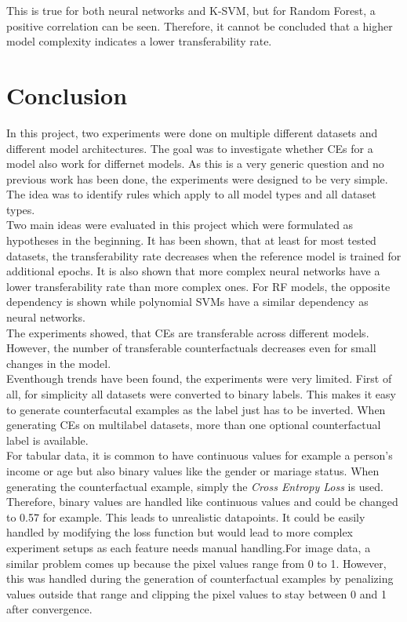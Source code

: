 \documentclass{article}
\begin{document}
This is true for both neural networks and K-SVM, but for Random Forest, a positive correlation can be seen. Therefore, it cannot be concluded that a higher model complexity indicates a lower transferability rate. 

\section{Conclusion}
In this project, two experiments were done on multiple different datasets and different model architectures. The goal was to investigate whether CEs for a model also work for differnet models. As this is a very generic question and no previous work has been done, the experiments were designed to be very simple. The idea was to identify rules which apply to all model types and all dataset types.\\
Two main ideas were evaluated in this project which were formulated as hypotheses in the beginning. It has been shown, that at least for most tested datasets, the transferability rate decreases when the reference model is trained for additional epochs. It is also shown that more complex neural networks have a lower transferability rate than more complex ones. For RF models, the opposite dependency is shown while polynomial SVMs have a similar dependency as neural networks. \\
The experiments showed, that CEs are transferable across different models. However, the number of transferable counterfactuals decreases even for small changes in the model. \\
Eventhough trends have been found, the experiments were very limited. First of all, for simplicity all datasets were converted to binary labels. This makes it easy to generate counterfacutal examples as the label just has to be inverted. When generating CEs on multilabel datasets, more than one optional counterfactual label is available. \\
For tabular data, it is common to have continuous values for example a person's income or age but also binary values like the gender or mariage status. When generating the counterfactual example, simply the \textit{Cross Entropy Loss} \cite{mao2023crossentropylossfunctionstheoretical} is used. Therefore, binary values are handled like continuous values and could be changed to 0.57 for example. This leads to unrealistic datapoints. It could be easily handled by modifying the loss function but would lead to more complex experiment setups as each feature needs manual handling.For image data, a similar problem comes up because the pixel values range from 0 to 1. However, this was handled during the generation of counterfactual examples by penalizing values outside that range and clipping the pixel values to stay between 0 and 1 after convergence.\\
\end{document}
